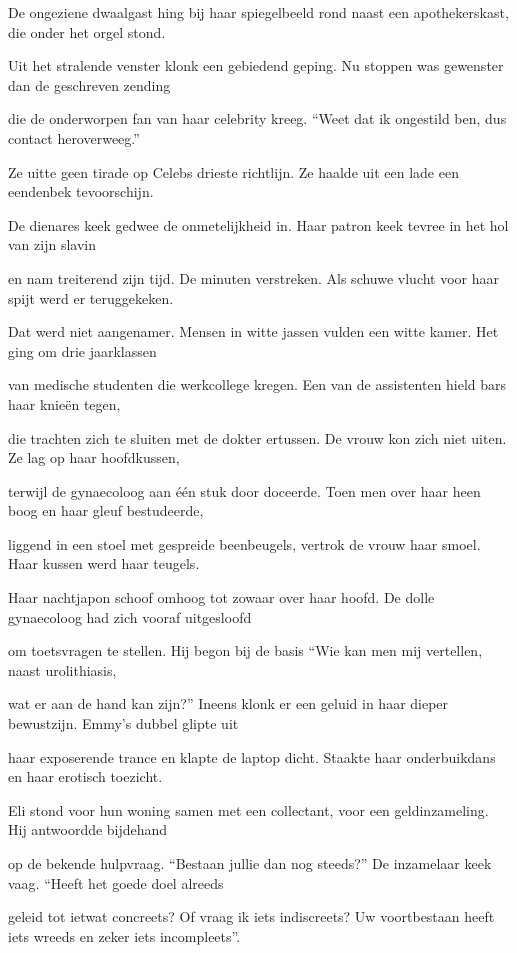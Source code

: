 De ongeziene dwaalgast
hing bij haar spiegelbeeld rond
naast een apothekerskast,
die onder het orgel stond.

Uit het stralende venster
klonk een gebiedend geping.
Nu stoppen was gewenster
dan de geschreven zending

die de onderworpen fan
van haar celebrity kreeg.
“Weet dat ik ongestild ben,
dus contact heroverweeg.”

Ze uitte geen tirade
op Celebs drieste richtlijn.
Ze haalde uit een lade
een eendenbek tevoorschijn.

De dienares keek gedwee
de onmetelijkheid in.
Haar patron keek tevree
in het hol van zijn slavin

en nam treiterend zijn tijd.
De minuten verstreken.
Als schuwe vlucht voor haar spijt
werd er teruggekeken.

Dat werd niet aangenamer.
Mensen in witte jassen
vulden een witte kamer.
Het ging om drie jaarklassen

van medische studenten
die werkcollege kregen.
Een van de assistenten
hield bars haar knieën tegen,

die trachten zich te sluiten
met de dokter ertussen.
De vrouw kon zich niet uiten.
Ze lag op haar hoofdkussen,

terwijl de gynaecoloog
aan één stuk door doceerde.
Toen men over haar heen boog
en haar gleuf bestudeerde,

liggend in een stoel
met gespreide beenbeugels,
vertrok de vrouw haar smoel.
Haar kussen werd haar teugels.

Haar nachtjapon schoof omhoog
tot zowaar over haar hoofd.
De dolle gynaecoloog
had zich vooraf uitgesloofd

om toetsvragen te stellen.
Hij begon bij de basis
“Wie kan men mij vertellen, naast urolithiasis,

wat er aan de hand kan zijn?”
Ineens klonk er een geluid
in haar dieper bewustzijn.
Emmy’s dubbel glipte uit

haar exposerende trance
en klapte de laptop dicht.
Staakte haar onderbuikdans
en haar erotisch toezicht.

Eli stond voor hun woning
samen met een collectant,
voor een geldinzameling.
Hij antwoordde bijdehand

op de bekende hulpvraag.
“Bestaan jullie dan nog steeds?”
De inzamelaar keek vaag.
“Heeft het goede doel alreeds

geleid tot ietwat concreets?
Of vraag ik iets indiscreets?
Uw voortbestaan heeft iets wreeds
en zeker iets incompleets”.

